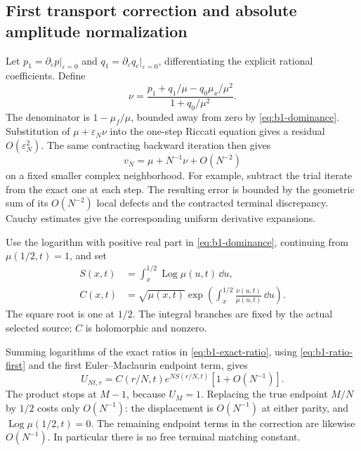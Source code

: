 \subsection{First transport correction and absolute amplitude normalization}

Let $p_1=\partial_{\varepsilon}p|_{\varepsilon=0}$ and
$q_1=\partial_{\varepsilon}q_c|_{\varepsilon=0}$, differentiating the
explicit rational coefficients. Define
\begin{equation}\label{eq:b1-nu}
 \nu=\frac{p_1+q_1/\mu-q_0\mu_x/\mu^2}
                  {1+q_0/\mu^2}.
\end{equation}
The denominator is $1-\mu_f/\mu$, bounded away from zero by
\eqref{eq:b1-dominance}. Substitution of
$\mu+\varepsilon_N\nu$ into the one-step Riccati equation gives a
residual $O(\varepsilon_N^2)$. The same contracting backward iteration
then gives
\begin{equation}\label{eq:b1-ratio-first}
 v_N=\mu+N^{-1}\nu+O(N^{-2})
\end{equation}
on a fixed smaller complex neighborhood. For example, subtract the
trial iterate from the exact one at each step. The resulting error is
bounded by the geometric sum of its $O(N^{-2})$ local defects and the
contracted terminal discrepancy. Cauchy estimates give the corresponding
uniform derivative expansions.

Use the logarithm with positive real part in
\eqref{eq:b1-dominance}, continuing from $\mu(1/2,t)=1$, and set
\begin{equation}\label{eq:b1-action-amplitude}
 \begin{split}
 S(x,t)&=\int_x^{1/2}\operatorname{Log}\mu(u,t)\,\dd u,\\
 C(x,t)&=\sqrt{\mu(x,t)}
 \exp\left(\int_x^{1/2}\frac{\nu(u,t)}{\mu(u,t)}\,\dd u\right).
 \end{split}
\end{equation}
The square root is one at $1/2$. The integral branches are fixed by the
actual selected source; $C$ is holomorphic and nonzero.

Summing logarithms of the exact ratios in
\eqref{eq:b1-exact-ratio}, using \eqref{eq:b1-ratio-first} and the first
Euler--Maclaurin endpoint term, gives
\begin{equation}\label{eq:b1-U-leading}
 U_{Nt,r}=C(r/N,t)e^{NS(r/N,t)}[1+O(N^{-1})].
\end{equation}
The product stops at $M-1$, because $U_M=1$. Replacing the true endpoint
$M/N$ by $1/2$ costs only $O(N^{-1})$: the displacement is $O(N^{-1})$
at either parity, and $\operatorname{Log}\mu(1/2,t)=0$. The remaining
endpoint terms in the correction are likewise $O(N^{-1})$. In
particular there is no free terminal matching constant.


